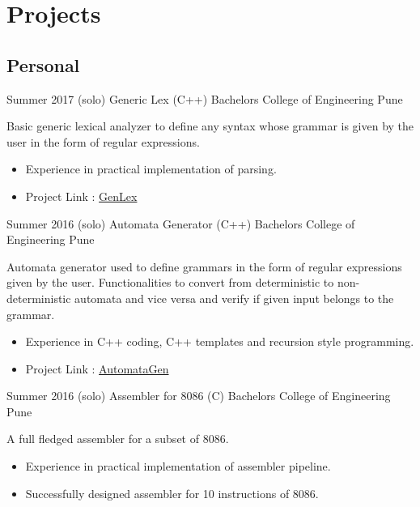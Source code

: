\section{Projects}

    \subsection{Personal}


        \cventry
            {Summer 2017 (solo)} %
            {Generic Lex (C++)} %
            {} %
            {Bachelors} %
            {College of Engineering Pune} 
            {
                Basic generic lexical analyzer to define any syntax whose grammar is given by the user in the form of regular expressions.     
                \begin{itemize}
                    \item Experience in practical implementation of parsing. 
                    \item Project Link : \href{https://github.com/jaag5678/Dragon.git}{GenLex}
                \end{itemize}
            }
            {}

        \cventry
            {Summer 2016 (solo)} %
            {Automata Generator (C++)} %
            {} %
            {Bachelors} 
            {College of Engineering Pune} %
            {
                Automata generator used to define grammars in the form of regular expressions given by the user.
                Functionalities to convert from deterministic to non-deterministic automata and vice versa and verify if given input belongs to the grammar.
                \begin{itemize} %
                    \item Experience in C++ coding, C++ templates and recursion style programming.
                    \item Project Link : \href{https://github.com/jaag5678/TCS_App.git}{AutomataGen}
                \end{itemize}
            }
            {}

        \cventry
            {Summer 2016 (solo)} %
            {Assembler for 8086 (C)} %
            {} %
            {Bachelors}
            {College of Engineering Pune} %
            {
                A full fledged assembler for a subset of 8086. 
                \begin{itemize} %
                    \item Experience in practical implementation of assembler pipeline.
                    \item Successfully designed assembler for 10 instructions of 8086.
                \end{itemize}
            }
            {}

